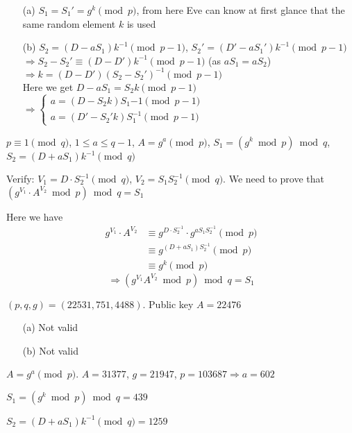\begin{exer}[4.8]
	\begin{enumerate}
		\item [(a)] $S_1 = S_1' = g^k \pmod p$, from here Eve can know at first glance that the same random element $k$ is used
		\item [(b)] $S_2 = (D-aS_1)k^{-1} \pmod{p-1}$, $S_2' = (D'-aS_1')k^{-1} \pmod{p-1}$ \\ $\Rightarrow S_2 - S_2' \equiv (D - D')k^{-1} \pmod{p-1}$ (as $aS_1 = aS_2$) \\ $\Rightarrow k = (D-D')(S_2-S_2')^{-1} \pmod{p-1}$ \\ Here we get $D - aS_1 = S_2 k \pmod{p-1}$ \\ $\Rightarrow \begin{cases}
			a = (D - S_2 k) S_1{-1} \pmod{p-1} \\ a = (D'-S_2' k) S_1^{-1} \pmod{p-1}
		\end{cases}$
	\end{enumerate}
\end{exer}

\begin{exer}[4.9] $p \equiv 1 \pmod q$, $1 \leq a \leq q-1$, $A=g^a \pmod p$, $S_1 = (g^k \bmod p) \bmod q$, $S_2 = (D + aS_1) k^{-1} \pmod q$
	
	Verify: $V_1 = D \cdot S_2^{-1} \pmod q$, $V_2 = S_1 S_2^{-1} \pmod q$. We need to prove that $(g^{V_1} \cdot A^{V_2} \bmod p) \bmod q = S_1$
	
	Here we have
	\begin{align*}
		g^{V_1} \cdot A^{V_2} & \equiv g^{D \cdot S_2^{-1}} \cdot g^{aS_1 S_2^{-1}} \pmod p \\ & \equiv g^{(D+aS_1)S_2^{-1}} \pmod p \\ & \equiv g^k \pmod p
	\end{align*}
	$$\Rightarrow (g^{V_1} A^{V_2} \bmod p) \bmod q = S_1$$
\end{exer}

\begin{exer}[4.10] $(p, q, g) = (22531, 751, 4488)$. Public key $A = 22476$
	\begin{enumerate}
		\item [(a)] Not valid
		\item [(b)] Not valid
	\end{enumerate}
\end{exer}

\begin{exer}[4.11] $A = g^a \pmod p$. $A = 31377$, $g = 21947$, $p = 103687 \Rightarrow a = 602$
	
	$S_1 = (g^k \bmod p) \bmod q = 439$
	
	$S_2 = (D + aS_1)k^{-1} \pmod q = 1259$
\end{exer}